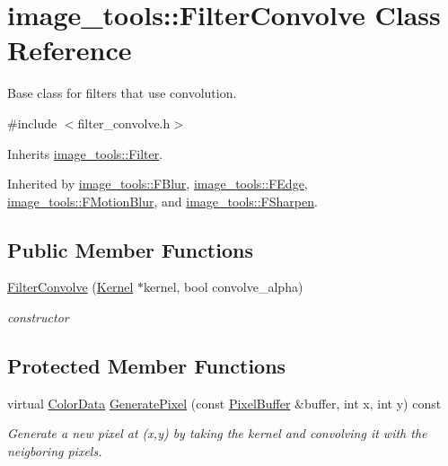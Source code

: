 \hypertarget{classimage__tools_1_1FilterConvolve}{}\section{image\+\_\+tools\+:\+:Filter\+Convolve Class Reference}
\label{classimage__tools_1_1FilterConvolve}


Base class for filters that use convolution.  




{\ttfamily \#include $<$filter\+\_\+convolve.\+h$>$}



Inherits \hyperlink{classimage__tools_1_1Filter}{image\+\_\+tools\+::\+Filter}.



Inherited by \hyperlink{classimage__tools_1_1FBlur}{image\+\_\+tools\+::\+F\+Blur}, \hyperlink{classimage__tools_1_1FEdge}{image\+\_\+tools\+::\+F\+Edge}, \hyperlink{classimage__tools_1_1FMotionBlur}{image\+\_\+tools\+::\+F\+Motion\+Blur}, and \hyperlink{classimage__tools_1_1FSharpen}{image\+\_\+tools\+::\+F\+Sharpen}.

\subsection*{Public Member Functions}
\begin{DoxyCompactItemize}
\item 
\hyperlink{classimage__tools_1_1FilterConvolve_ae5671442eee4070c4aa9d38390653e73}{Filter\+Convolve} (\hyperlink{classimage__tools_1_1Kernel}{Kernel} $\ast$kernel, bool convolve\+\_\+alpha)\hypertarget{classimage__tools_1_1FilterConvolve_ae5671442eee4070c4aa9d38390653e73}{}\label{classimage__tools_1_1FilterConvolve_ae5671442eee4070c4aa9d38390653e73}

\begin{DoxyCompactList}\small\item\em constructor \end{DoxyCompactList}\end{DoxyCompactItemize}
\subsection*{Protected Member Functions}
\begin{DoxyCompactItemize}
\item 
virtual \hyperlink{classimage__tools_1_1ColorData}{Color\+Data} \hyperlink{classimage__tools_1_1FilterConvolve_ad318986a25e6cd6685e61dff5f99adb5}{Generate\+Pixel} (const \hyperlink{classimage__tools_1_1PixelBuffer}{Pixel\+Buffer} \&buffer, int x, int y) const 
\begin{DoxyCompactList}\small\item\em Generate a new pixel at (x,y) by taking the kernel and convolving it with the neigboring pixels. \end{DoxyCompactList}\end{DoxyCompactItemize}
